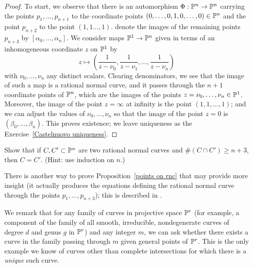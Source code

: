 \begin{proof}
To start, we observe that there is an automorphism $\Phi : {\mathbb P}^n \to {\mathbb P}^n$ carrying the points $p_1,\dots,p_{n+1}$ to the coordinate points $(0,\dots,0,1,0,\dots,0)\in {\mathbb P}^n$ and the point $p_{n+2}$ to the point $(1,1\dots,1)$.  denote the images of the remaining  points $p_{n+3}$  by $[\alpha_0,\dots,\alpha_n]$. We consider maps ${\mathbb P}^1 \to {\mathbb P}^n$ given in terms of an inhomogeneous coordinate $z$ on ${\mathbb P}^1$ by
$$
z \mapsto \left( \frac{1}{z - \nu_0}, \frac{1}{z - \nu_1} , \dots, \frac{1}{z - \nu_n}  \right)
$$
with $\nu_0,\dots,\nu_n$ any distinct scalars. Clearing denominators, we see that the image of such a map is a rational normal curve, and it passes through the $n+1$ coordinate points of ${\mathbb P}^n$, which are the images of the points $z = \nu_0, \dots, \nu_n \in {\mathbb P}^1$. Moreover, the image of the point $z = \infty$ at infinity is the point $(1,1, \dots,1)$; and we can adjust the values of $\nu_0,\dots,\nu_n$ so that the image of the point $z = 0$ is $(\beta_0,\dots,\beta_n)$. This proves existence; we leave uniqueness as the Exercise~\ref{Castelnuovo uniqueness}. 
\end{proof}

\begin{exercise}\label{Castelnuovo uniqueness}
Show that if $C, C' \subset {\mathbb P}^n$ are two rational normal curves and $\#(C \cap C') \geq n+3$, then $C = C'$. (Hint: use induction on $n$.)
\end{exercise}

There is another way to prove Proposition~\ref{points on rnc} that may provide more insight (it actually produces the equations defining the rational normal curve through the points $p_1,\dots,p_{n+3}$); this is described in \cite{Montreal}. 

We remark that for any family of curves in projective space ${\mathbb P}^r$ (for example, a component of the family of all smooth, irreducible, nondegenerate curves of degree $d$ and genus $g$ in ${\mathbb P}^r$) and any integer $m$, we can ask whether there exists a curve in the family passing through $m$ given general points of ${\mathbb P}^r$. This is the only example we know of curves other than complete intersections for which there is a \emph{unique} such curve.

